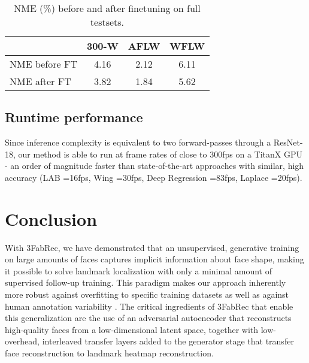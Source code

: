 \documentclass[10pt,twocolumn,letterpaper]{article}
\begin{document}
\begin{table}
	\footnotesize
	\begin{center}
		\begin{tabular}{l | c | c|  c }
			&  \bf 300-W & \bf AFLW & \bf WFLW \\
			\toprule
			NME before FT & 4.16    & 2.12 & 6.11  \\
			NME after FT  &  3.82    & 1.84 & 5.62   \\
			\bottomrule
		\end{tabular}	
	\end{center}
	\vspace{-0.5cm}
	\caption{\small NME (\%) before and after finetuning on full testsets. }
	\label{tab:ablationFT}
	\vspace{-0.3cm}
\end{table}

\vspace{-0.0cm}\subsection{Runtime performance}
Since inference complexity is equivalent to two forward-passes through a ResNet-18, our method is able to run at frame rates of close to 300fps on a TitanX GPU - an order of magnitude faster than state-of-the-art approaches with similar, high accuracy (LAB \cite{Wu2018}=16fps, Wing \cite{Feng2017}=30fps, Deep Regression \cite{Lv2017}=83fps, Laplace \cite{Robinson2019}=20fps).



\section{Conclusion}\vspace{-0.0cm}
With 3FabRec, we have demonstrated that an unsupervised, generative training on large amounts of faces captures implicit information about face shape, making it possible to solve landmark localization with only a minimal amount of supervised follow-up training. This paradigm makes our approach inherently more robust against overfitting to specific training datasets as well as against human annotation variability \cite{Dong2018}. The critical ingredients of 3FabRec that enable this generalization are the use of an adversarial autoencoder that reconstructs high-quality faces from a low-dimensional latent space, together with low-overhead, interleaved transfer layers added to the generator stage that transfer face reconstruction to landmark heatmap reconstruction. 
\end{document}
